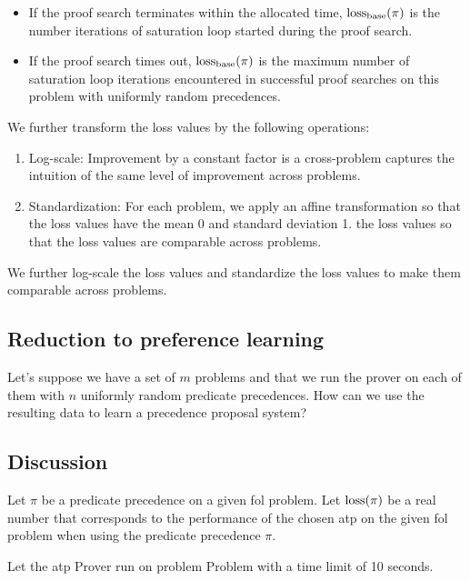 \begin{itemize}
	\item If the proof search terminates within the allocated time,
	\(\base_loss(\pi)\) is the number iterations of saturation loop started during the proof search.
	\item If the proof search times out, \(\base_loss(\pi)\) is the maximum number
	of saturation loop iterations encountered in successful proof searches on this problem
	with uniformly random precedences.
\end{itemize}

We further transform the loss values by the following operations:

\begin{enumerate}
	\item Log-scale: Improvement by a constant factor is a cross-problem  captures the intuition of the same level of improvement across problems.
	\item Standardization: For each problem,
	we apply an affine transformation so that the loss values have the mean 0 and standard deviation 1.
	the loss values so that the loss values are comparable across problems.
\end{enumerate}

We further log-scale the loss values
and standardize\cite{?} the loss values to make them comparable across problems.

\subsection{Reduction to preference learning}

Let's  suppose we have a set of \(m\) problems
and that we run the prover on each of them with \(n\) uniformly random predicate precedences.
How can we use the resulting data to learn a precedence proposal system?

\subsection{Discussion}

Let \(\pi\) be a predicate precedence on a given \gls{fol} problem.
Let \(\operatorname{loss}(\pi)\) be a real number that corresponds to the performance of the chosen \gls{atp}
on the given \gls{fol} problem when using the predicate precedence \(\pi\).

Let the \gls{atp} Prover run on problem Problem with a time limit of 10 seconds.


